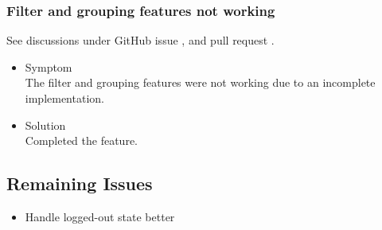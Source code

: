 \documentclass[oneside, english, final]{design}
\begin{document}
\subsubsection{Filter and grouping features not working}

See discussions under GitHub issue \href{https://github.com/DHSTTOS/implementation/issues/86}{\color{blue}{\#86}}, \href{https://github.com/DHSTTOS/implementation/issues/86}{\color{blue}{\#74}} and pull request \href{https://github.com/DHSTTOS/implementation/issues/101}{\color{blue}{\#101}}.

\begin{itemize}
      \item{Symptom
            \\
            The filter and grouping features were not working due to an incomplete implementation.}

      \item{Solution
            \\
            Completed the feature.
            }
\end{itemize}


\subsection{Remaining Issues}
\begin{itemize}
      \item{Handle logged-out state better}
      
      

\end{itemize}
\end{document}
